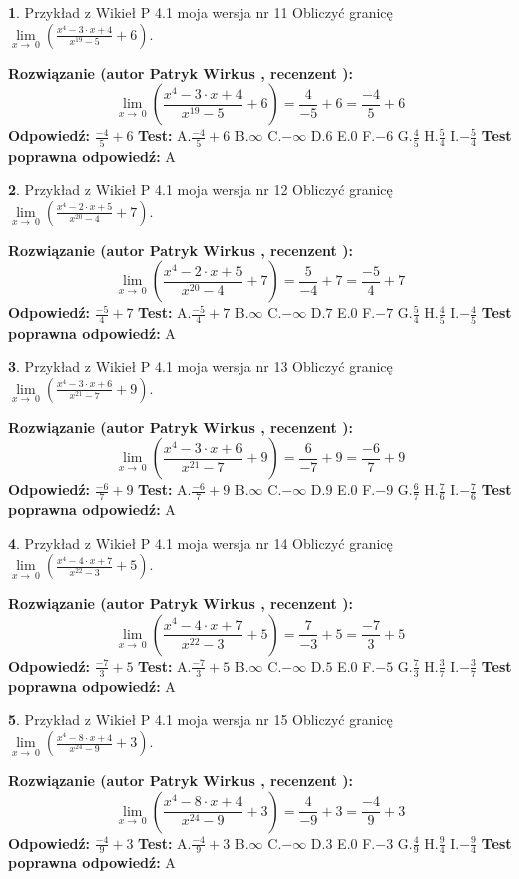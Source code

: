 \documentclass[12pt, a4paper]{article}
\theoremstyle{definition} %
\newtheorem{zad}{}
\newcommand{\zadStart}[1]{\begin{zad}#1\newline}
\newcommand{\zadStop}{\end{zad}}
\newcommand{\rozwStart}[2]{\noindent \textbf{Rozwiązanie (autor #1 , recenzent #2): }\newline}
\newcommand{\rozwStop}{\newline}
\newcommand{\odpStart}{\noindent \textbf{Odpowiedź:}\newline}
\newcommand{\odpStop}{\newline}
\newcommand{\testStart}{\noindent \textbf{Test:}\newline}
\newcommand{\testStop}{\newline}
\newcommand{\kluczStart}{\noindent \textbf{Test poprawna odpowiedź:}\newline}
\newcommand{\kluczStop}{\newline}
\begin{document}
\zadStart{Przykład z Wikieł P 4.1 moja wersja nr 11}
Obliczyć granicę $\lim\limits_{x\to\ 0}(\frac{x^{4}-3 \cdot x +4}{x^{19}-5}+6)$.
\zadStop
\rozwStart{Patryk Wirkus}{}
$$\lim\limits_{x\to\ 0}(\frac{x^{4}-3 \cdot x +4}{x^{19}-5}+6)=\frac{4}{-5}+6=\frac{-4}{5}+6$$
\rozwStop
\odpStart
$\frac{-4}{5}+6$
\odpStop
\testStart
A.$\frac{-4}{5}+6$
B.$\infty$
C.$-\infty$
D.$6$
E.$0$
F.$-6$
G.$\frac{4}{5}$
H.$\frac{5}{4}$
I.$-\frac{5}{4}$
\testStop
\kluczStart
A
\kluczStop



\zadStart{Przykład z Wikieł P 4.1 moja wersja nr 12}
Obliczyć granicę $\lim\limits_{x\to\ 0}(\frac{x^{4}-2 \cdot x +5}{x^{20}-4}+7)$.
\zadStop
\rozwStart{Patryk Wirkus}{}
$$\lim\limits_{x\to\ 0}(\frac{x^{4}-2 \cdot x +5}{x^{20}-4}+7)=\frac{5}{-4}+7=\frac{-5}{4}+7$$
\rozwStop
\odpStart
$\frac{-5}{4}+7$
\odpStop
\testStart
A.$\frac{-5}{4}+7$
B.$\infty$
C.$-\infty$
D.$7$
E.$0$
F.$-7$
G.$\frac{5}{4}$
H.$\frac{4}{5}$
I.$-\frac{4}{5}$
\testStop
\kluczStart
A
\kluczStop



\zadStart{Przykład z Wikieł P 4.1 moja wersja nr 13}
Obliczyć granicę $\lim\limits_{x\to\ 0}(\frac{x^{4}-3 \cdot x +6}{x^{21}-7}+9)$.
\zadStop
\rozwStart{Patryk Wirkus}{}
$$\lim\limits_{x\to\ 0}(\frac{x^{4}-3 \cdot x +6}{x^{21}-7}+9)=\frac{6}{-7}+9=\frac{-6}{7}+9$$
\rozwStop
\odpStart
$\frac{-6}{7}+9$
\odpStop
\testStart
A.$\frac{-6}{7}+9$
B.$\infty$
C.$-\infty$
D.$9$
E.$0$
F.$-9$
G.$\frac{6}{7}$
H.$\frac{7}{6}$
I.$-\frac{7}{6}$
\testStop
\kluczStart
A
\kluczStop



\zadStart{Przykład z Wikieł P 4.1 moja wersja nr 14}
Obliczyć granicę $\lim\limits_{x\to\ 0}(\frac{x^{4}-4 \cdot x +7}{x^{22}-3}+5)$.
\zadStop
\rozwStart{Patryk Wirkus}{}
$$\lim\limits_{x\to\ 0}(\frac{x^{4}-4 \cdot x +7}{x^{22}-3}+5)=\frac{7}{-3}+5=\frac{-7}{3}+5$$
\rozwStop
\odpStart
$\frac{-7}{3}+5$
\odpStop
\testStart
A.$\frac{-7}{3}+5$
B.$\infty$
C.$-\infty$
D.$5$
E.$0$
F.$-5$
G.$\frac{7}{3}$
H.$\frac{3}{7}$
I.$-\frac{3}{7}$
\testStop
\kluczStart
A
\kluczStop



\zadStart{Przykład z Wikieł P 4.1 moja wersja nr 15}
Obliczyć granicę $\lim\limits_{x\to\ 0}(\frac{x^{4}-8 \cdot x +4}{x^{24}-9}+3)$.
\zadStop
\rozwStart{Patryk Wirkus}{}
$$\lim\limits_{x\to\ 0}(\frac{x^{4}-8 \cdot x +4}{x^{24}-9}+3)=\frac{4}{-9}+3=\frac{-4}{9}+3$$
\rozwStop
\odpStart
$\frac{-4}{9}+3$
\odpStop
\testStart
A.$\frac{-4}{9}+3$
B.$\infty$
C.$-\infty$
D.$3$
E.$0$
F.$-3$
G.$\frac{4}{9}$
H.$\frac{9}{4}$
I.$-\frac{9}{4}$
\testStop
\kluczStart
A
\kluczStop
\end{document}
